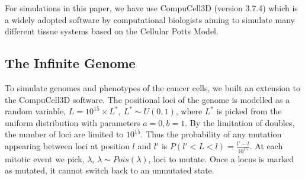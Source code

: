 \documentclass[12pt]{article}
\newtheorem{definition}{Definition}
\begin{document}



For simulations in this paper, we have use CompuCell3D \cite{Swat2012} (version 3.7.4) which is a widely adopted software by computational biologists aiming to simulate many different tissue systems based on the Cellular Potts Model.

\subsection{The Infinite Genome}
To simulate genomes and phenotypes of the cancer cells, we built an extension to the CompuCell3D software. The positional loci of the genome is modelled as a random variable, $L = 10^{15}\times L^*,~L^* \sim U(0,1)$, where $L^*$ is picked from the uniform distribution with parameters $a=0, b=1$. By the limitation of doubles, the number of loci are limited to $10^{15}$. Thus the probability of any mutation appearing between loci at position $l$ and $l'$ is $P( l' < L < l) = \frac{l' - l}{10^{15}}$. At each mitotic event we pick, $\lambda$, $\lambda \sim Pois(\lambda)$, loci to mutate. Once a locus is marked as mutated, it cannot switch back to an unmutated state.
\end{document}
